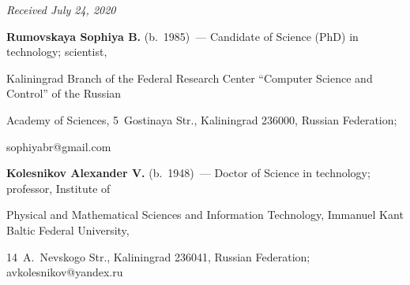 \vspace*{-6pt}



\hfill{\small\textit{Received July 24, 2020}} 



\vspace*{-12pt} 

   

   \Contr

   

   \vspace*{-6pt}

   

   \noindent

   \textbf{Rumovskaya Sophiya B.} (b.\ 1985)~--- Candidate of Science (PhD) in technology; scientist, 

Kaliningrad Branch of the Federal Research Center ``Computer Science and Control'' of the Russian 

Academy of Sciences, 5~Gostinaya Str., Kaliningrad 236000, Russian Federation; 

\mbox{sophiyabr@gmail.com}

   

   \vspace*{2pt}

   

   \noindent

   \textbf{Kolesnikov Alexander V.} (b.\ 1948)~--- Doctor of Science in technology; professor, Institute of 

Physical and Mathematical Sciences and Information Technology, Immanuel Kant Baltic Federal University, 

14~A.~Nevskogo Str., Kaliningrad 236041, Russian Federation; \mbox{avkolesnikov@yandex.ru}

\label{end\stat}



\renewcommand{\bibname}{\protect\rm Литература} 

    

